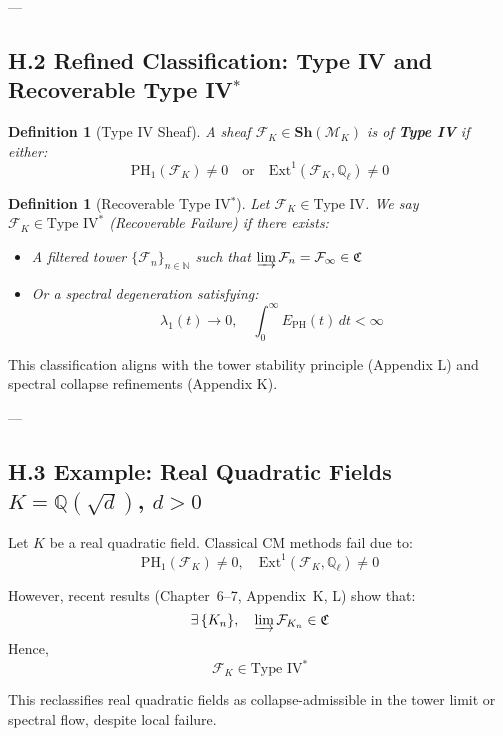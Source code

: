 \documentclass[11pt]{article}
\newtheorem{definition}[theorem]{Definition}
\begin{document}
---

\subsection*{H.2 Refined Classification: Type IV and Recoverable Type IV\(^\ast\)}
\label{subsec:type-iv-refined}

\begin{definition}[Type IV Sheaf]
A sheaf \( \mathcal{F}_K \in \mathbf{Sh}(\mathcal{M}_K) \) is of \textbf{Type IV} if either:
\[
\mathrm{PH}_1(\mathcal{F}_K) \ne 0 \quad \text{or} \quad \mathrm{Ext}^1(\mathcal{F}_K, \mathbb{Q}_\ell) \ne 0
\]
\end{definition}

\begin{definition}[Recoverable Type IV\(^{\ast}\)]
Let \( \mathcal{F}_K \in \text{Type IV} \).  
We say \( \mathcal{F}_K \in \text{Type IV}^{\ast} \) (Recoverable Failure) if there exists:
\begin{itemize}
  \item A filtered tower \( \{ \mathcal{F}_n \}_{n \in \mathbb{N}} \) such that \( \varinjlim \mathcal{F}_n = \mathcal{F}_\infty \in \mathfrak{C} \)
  \item Or a spectral degeneration satisfying:
  \[
  \lambda_1(t) \to 0, \quad \int_0^\infty E_{\mathrm{PH}}(t)\,dt < \infty
  \]
\end{itemize}
\end{definition}

This classification aligns with the tower stability principle (Appendix L) and spectral collapse refinements (Appendix K).

---

\subsection*{H.3 Example: Real Quadratic Fields \( K = \mathbb{Q}(\sqrt{d}) \), \( d > 0 \)}

Let \( K \) be a real quadratic field. Classical CM methods fail due to:
\[
\mathrm{PH}_1(\mathcal{F}_K) \ne 0, \quad \mathrm{Ext}^1(\mathcal{F}_K, \mathbb{Q}_\ell) \ne 0
\]

However, recent results (Chapter~6–7, Appendix~K, L) show that:
\[
\exists \, \{K_n\}, \quad \varinjlim \mathcal{F}_{K_n} \in \mathfrak{C}
\]
Hence,
\[
\mathcal{F}_K \in \text{Type IV}^{\ast}
\]

This reclassifies real quadratic fields as collapse-admissible in the tower limit or spectral flow, despite local failure.
\end{document}

